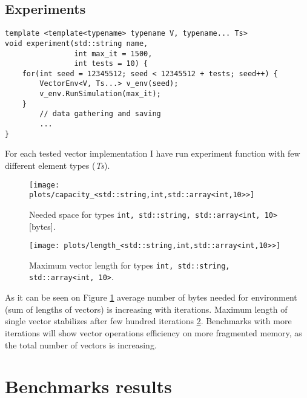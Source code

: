 \documentclass[inz, english, shortabstract]{iithesis}
\begin{document}
\section {Experiments}
\begin{lstlisting}[caption=experiment function]
template <template<typename> typename V, typename... Ts>
void experiment(std::string name, 
				int max_it = 1500, 
				int tests = 10) {
	for(int seed = 12345512; seed < 12345512 + tests; seed++) {
		VectorEnv<V, Ts...> v_env(seed);
		v_env.RunSimulation(max_it);
	}
		// data gathering and saving
		...
}
\end{lstlisting}
For each tested vector implementation I have run experiment function with few different element types ({\it Ts}). 

\begin{figure}[h!]
\texttt{[image: plots/capacity\_<std::string,int,std::array<int,10>>]}
\caption{Needed space for types \lstinline{int, std::string, std::array<int, 10>} [bytes].}
\label{space_consumption}
\end{figure}

\begin{figure}[h!]
\texttt{[image: plots/length\_<std::string,int,std::array<int,10>>]}
\caption{Maximum vector length for types \lstinline{int, std::string, std::array<int, 10>}.}
\label{vector_length}
\end{figure}


As it can be seen on Figure \ref{space_consumption} average number of bytes needed for environment (sum of lengths of vectors) is increasing with iterations. Maximum length of single vector stabilizes after few hundred iterations \ref{vector_length}. Benchmarks with more iterations will show vector operations efficiency on more fragmented memory, as the total number of vectors is increasing.

\chapter{Benchmarks results}
\end{document}
